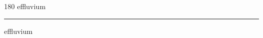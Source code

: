 
\begin{frame}
\begin{center}
\begin{turn}{180}
{\fontsize{2.5cm}{1em}\selectfont effluvium}
\end{turn}
\vspace{1em}\par  
\hrule
\vspace{1em}\par  
{\fontsize{2.5cm}{1em}\selectfont effluvium}
\end{center}
\end{frame}
